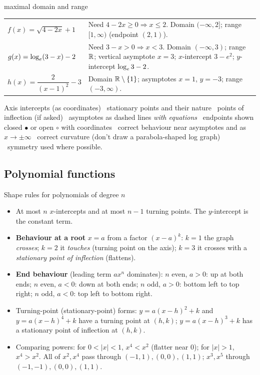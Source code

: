 \begin{example}{maximal domain and range \byhand}
\begin{tabularx}{\linewidth}{@{}p{3.8cm}L@{}}
$f(x)=\sqrt{4-2x}+1$ & Need $4-2x\ge0\Rightarrow x\le2$. Domain $(-\infty,2]$; range $[1,\infty)$ (endpoint $(2,1)$). \\
$g(x)=\log_e(3-x)-2$ & Need $3-x>0\Rightarrow x<3$. Domain $(-\infty,3)$; range $\mathbb{R}$; vertical asymptote $x=3$; $x$-intercept $3-e^2$; $y$-intercept $\log_e3-2$. \\
$h(x)=\dfrac{2}{(x-1)^2}-3$ & Domain $\mathbb{R}\setminus\{1\}$; asymptotes $x=1$, $y=-3$; range $(-3,\infty)$. \\
\end{tabularx}
\end{example}

\begin{tip}
Axis intercepts (as coordinates) \textbullet\ stationary points and their nature \textbullet\ points of inflection (if asked) \textbullet\ asymptotes as dashed lines \emph{with equations} \textbullet\ endpoints shown closed $\bullet$ or open $\circ$ with coordinates \textbullet\ correct behaviour near asymptotes and as $x\to\pm\infty$ \textbullet\ correct curvature (don't draw a parabola-shaped log graph) \textbullet\ symmetry used where possible.
\end{tip}

\subsection{Polynomial functions}
\label{sec:poly}

\begin{keyres}{Shape rules for polynomials of degree $n$}
\begin{itemize}
  \item At most $n$ $x$-intercepts and at most $n-1$ turning points. The $y$-intercept is the constant term.
  \item \textbf{Behaviour at a root} $x=a$ from a factor $(x-a)^k$: $k=1$ the graph \emph{crosses}; $k=2$ it \emph{touches} (turning point on the axis); $k=3$ it crosses with a \emph{stationary point of inflection} (flattens).
  \item \textbf{End behaviour} (leading term $ax^n$ dominates): $n$ even, $a>0$: up at both ends; $n$ even, $a<0$: down at both ends; $n$ odd, $a>0$: bottom left to top right; $n$ odd, $a<0$: top left to bottom right.
  \item Turning-point (stationary-point) forms: $y=a(x-h)^2+k$ and $y=a(x-h)^4+k$ have a turning point at $(h,k)$; $y=a(x-h)^3+k$ has a stationary point of inflection at $(h,k)$.
  \item Comparing powers: for $0<|x|<1$, $x^4<x^2$ (flatter near $0$); for $|x|>1$, $x^4>x^2$. All of $x^2,x^4$ pass through $(-1,1),(0,0),(1,1)$; $x^3,x^5$ through $(-1,-1),(0,0),(1,1)$.
\end{itemize}
\end{keyres}

